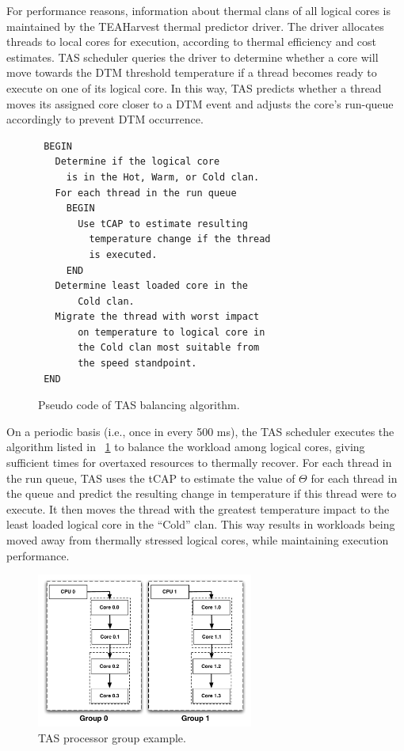 \documentclass[times, 10pt,twocolumn]{IEEEtran}
\begin{document}
For performance reasons, information about thermal clans of all logical
cores is maintained by the TEAHarvest thermal predictor driver.  The
driver allocates threads to local cores for execution, according to
thermal efficiency and cost estimates.  TAS scheduler queries the driver
to determine whether a core will move towards the DTM threshold
temperature if a thread becomes ready to execute on one of its logical
core.  In this way, TAS predicts whether a thread moves its assigned
core closer to a DTM event and adjusts the core's run-queue accordingly
to prevent DTM occurrence.
{\setlength{\abovecaptionskip}{0ex}
\begin{figure}[t] 
\centering
\begin{verbatim} 
 BEGIN 
   Determine if the logical core 
     is in the Hot, Warm, or Cold clan.  
   For each thread in the run queue 
     BEGIN 
       Use tCAP to estimate resulting 
         temperature change if the thread 
         is executed. 
     END 
   Determine least loaded core in the
       Cold clan.  
   Migrate the thread with worst impact 
       on temperature to logical core in
       the Cold clan most suitable from
       the speed standpoint.  
 END
\end{verbatim}
\caption{Pseudo code of TAS balancing algorithm.}
\label{fig:tascode}
\end{figure}
} 
On a periodic basis (i.e., once in every 500 ms), the TAS scheduler
executes the algorithm listed in \figurename~\ref{fig:tascode} to
balance the workload among logical cores, giving sufficient times for
overtaxed resources to thermally recover.  For each thread in the run
queue, TAS uses the tCAP to estimate the value of $\Theta$ for each
thread in the queue and predict the resulting change in temperature if
this thread were to execute.  It then moves the thread with the greatest
temperature impact to the least loaded logical core in the ``Cold''
clan.  This way results in workloads being moved away from thermally
stressed logical cores, while maintaining execution performance.

\begin{figure}[t]
  \centering
  \includegraphics[width=1.0\linewidth,height=2in]{th_pgroup}
  \caption{TAS processor group example.}
  \label{fig:tasprocgroup}
\end{figure}
\end{document}
